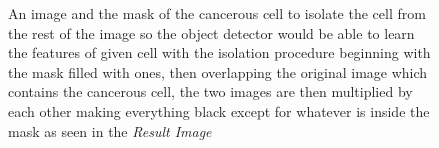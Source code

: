 \documentclass[12pt]{extarticle}
\begin{document}
	\begin{figure}
		\centering
		\qquad
		\qquad
		\caption{An image and the mask of the cancerous cell to isolate the cell from the rest of the image so the object detector would be able to learn the features of given cell with the isolation procedure beginning with the mask filled with ones, then overlapping the original image which contains the cancerous cell, the two images are then multiplied by each other making everything black except for whatever is inside the mask as seen in the \emph{Result Image}}
		\label{fig:img_cont}
	\end{figure}
	
\end{document}
